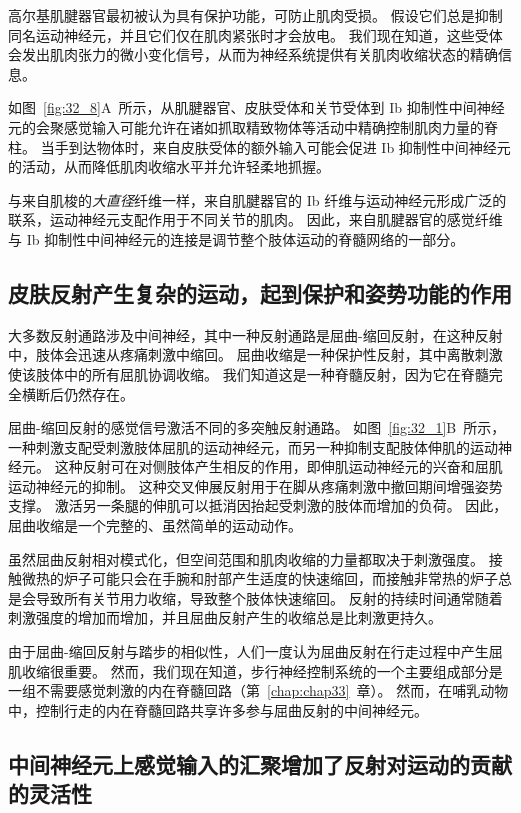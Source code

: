 高尔基肌腱器官最初被认为具有保护功能，可防止肌肉受损。
假设它们总是抑制同名运动神经元，并且它们仅在肌肉紧张时才会放电。
我们现在知道，这些受体会发出肌肉张力的微小变化信号，从而为神经系统提供有关肌肉收缩状态的精确信息。


如图~\ref{fig:32_8}A~所示，从肌腱器官、皮肤受体和关节受体到 Ib 抑制性中间神经元的会聚感觉输入可能允许在诸如抓取精致物体等活动中精确控制肌肉力量的脊柱。
当手到达物体时，来自皮肤受体的额外输入可能会促进 Ib 抑制性中间神经元的活动，从而降低肌肉收缩水平并允许轻柔地抓握。


与来自肌梭的\textit{大直径}纤维一样，来自肌腱器官的 Ib 纤维与运动神经元形成广泛的联系，运动神经元支配作用于不同关节的肌肉。
因此，来自肌腱器官的感觉纤维与 Ib 抑制性中间神经元的连接是调节整个肢体运动的脊髓网络的一部分。



\subsection{皮肤反射产生复杂的运动，起到保护和姿势功能的作用}

大多数反射通路涉及中间神经，其中一种反射通路是屈曲-缩回反射，在这种反射中，肢体会迅速从疼痛刺激中缩回。
屈曲收缩是一种保护性反射，其中离散刺激使该肢体中的所有屈肌协调收缩。
我们知道这是一种脊髓反射，因为它在脊髓完全横断后仍然存在。


屈曲-缩回反射的感觉信号激活不同的多突触反射通路。 
如图~\ref{fig:32_1}B~所示，一种刺激支配受刺激肢体屈肌的运动神经元，而另一种抑制支配肢体伸肌的运动神经元。
这种反射可在对侧肢体产生相反的作用，即伸肌运动神经元的兴奋和屈肌运动神经元的抑制。
这种交叉伸展反射用于在脚从疼痛刺激中撤回期间增强姿势支撑。
激活另一条腿的伸肌可以抵消因抬起受刺激的肢体而增加的负荷。
因此，屈曲收缩是一个完整的、虽然简单的运动动作。


虽然屈曲反射相对模式化，但空间范围和肌肉收缩的力量都取决于刺激强度。
接触微热的炉子可能只会在手腕和肘部产生适度的快速缩回，而接触非常热的炉子总是会导致所有关节用力收缩，导致整个肢体快速缩回。
反射的持续时间通常随着刺激强度的增加而增加，并且屈曲反射产生的收缩总是比刺激更持久。


由于屈曲-缩回反射与踏步的相似性，人们一度认为屈曲反射在行走过程中产生屈肌收缩很重要。
然而，我们现在知道，步行神经控制系统的一个主要组成部分是一组不需要感觉刺激的内在脊髓回路（第~\ref{chap:chap33}~章）。
然而，在哺乳动物中，控制行走的内在脊髓回路共享许多参与屈曲反射的中间神经元。



\subsection{中间神经元上感觉输入的汇聚增加了反射对运动的贡献的灵活性}


